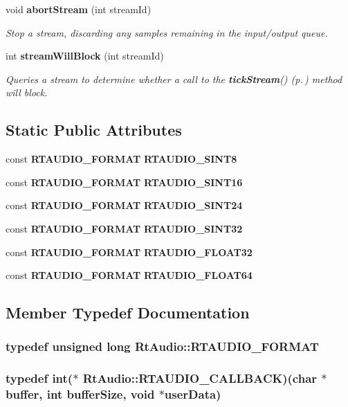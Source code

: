 \begin{CompactItemize}
void {\bf abort\-Stream} (int stream\-Id)
\begin{CompactList}\small\item\em Stop a stream, discarding any samples remaining in the input/output queue.\item\end{CompactList}\item 
int {\bf stream\-Will\-Block} (int stream\-Id)
\begin{CompactList}\small\item\em Queries a stream to determine whether a call to the {\bf tick\-Stream}() {\rm (p.\,\pageref{classRtAudio_a9})} method will block.\item\end{CompactList}\end{CompactItemize}
\subsection*{Static Public Attributes}
\begin{CompactItemize}
\item 
const {\bf RTAUDIO\_\-FORMAT} {\bf RTAUDIO\_\-SINT8}
\item 
const {\bf RTAUDIO\_\-FORMAT} {\bf RTAUDIO\_\-SINT16}
\item 
const {\bf RTAUDIO\_\-FORMAT} {\bf RTAUDIO\_\-SINT24}
\item 
const {\bf RTAUDIO\_\-FORMAT} {\bf RTAUDIO\_\-SINT32}
\item 
const {\bf RTAUDIO\_\-FORMAT} {\bf RTAUDIO\_\-FLOAT32}
\item 
const {\bf RTAUDIO\_\-FORMAT} {\bf RTAUDIO\_\-FLOAT64}
\end{CompactItemize}


\subsection{Member Typedef Documentation}
\subsubsection{\setlength{\rightskip}{0pt plus 5cm}typedef unsigned long Rt\-Audio::RTAUDIO\_\-FORMAT}\label{classRtAudio_s0}


\subsubsection{\setlength{\rightskip}{0pt plus 5cm}typedef int($\ast$ Rt\-Audio::RTAUDIO\_\-CALLBACK)(char $\ast$buffer, int buffer\-Size, void $\ast$user\-Data)}\label{classRtAudio_s1}




